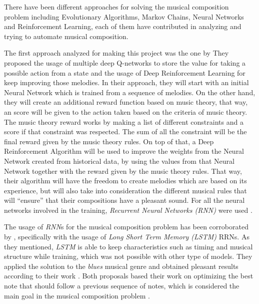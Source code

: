 There have been different approaches for solving the musical composition problem including Evolutionary Algorithms, Markov Chains, Neural Networks and Reinforcement Learning, each of them have contributed in analyzing and trying to automate musical composition.

The first approach analyzed for making this project was the one by \citeauthor{deeprl2016music} They proposed the usage of multiple deep Q-networks to store the value for taking a possible action from a state and the usage of Deep Reinforcement Learning for keep improving those melodies. In their approach, they will start with an initial Neural Network which is trained from a sequence of melodies. On the other hand, they will create an additional reward function based on music theory, that way, an score will be given to the action taken based on the criteria of music theory. The music theory reward works by making a list of different constraints and a score if that constraint was respected. The sum of all the constraint will be the final reward given by the music theory rules. On top of that, a Deep Reinforcement Algorithm will be used to improve the weights from the Neural Network created from historical data, by using the values from that Neural Network together with the reward given by the music theory rules. That way, their algorithm will have the freedom to create melodies which are based on its experience, but will also take into consideration the different musical rules that will ``ensure'' that their compositions have a pleasant sound. For all the neural networks involved in the training, \emph{Recurrent Neural Networks (RNN)} were used \cite{deeprl2016music}. 

The usage of \emph{RNN}s for the musical composition problem has been corroborated by \citeauthor{eck2002blues}, specifically with the usage of \emph{Long Short Term Memory (LSTM)} RRNs. As they mentioned, \emph{LSTM} is able to keep characteristics such as timing and musical structure while training, which was not possible with other type of models. They applied the solution to the \emph{blues} musical genre and obtained pleasant results according to their work \cite{eck2002blues}. Both proposals based their work on optimizing the best note that should follow a previous sequence of notes, which is considered the main goal in the musical composition problem \cite{connectionist1989}. 


